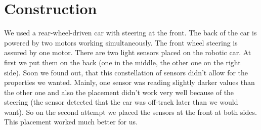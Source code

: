 \section{Construction}
We used a rear-wheel-driven car with steering at the front. The back of the car is powered by two motors working simultaneously. The front wheel steering is assured by one motor. 
There are two light sensors placed on the robotic car. At first we put them on the back (one in the middle, the other one on the right side). Soon we found out, that this constellation of 
sensors didn't allow for the properties we wanted. Mainly, one sensor was reading slightly darker values than the other one and also the placement didn't work very well because of the steering 
(the sensor detected that the car was off-track later than we would want). So on the second attempt we placed the sensors at the front at both sides. This placement worked much better for us.
